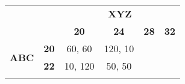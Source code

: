 \documentclass{standalone}
\begin{document}
\begin{tabular}{rccccc}
& & \multicolumn{4}{c}{\textbf{XYZ}} \\
& & \textbf{20} & \textbf{24} & \textbf{28} & \textbf{32}  \\ 
\cline{3-6}
\multirow{2}{*}{\textbf{ABC}}& \textbf{20} & \multicolumn{1}{|c|}{60, 60} & \multicolumn{1}{c|}{120, 10} \\ 
\cline{3-6}
& \textbf{22} & \multicolumn{1}{|c|}{10, 120} & \multicolumn{1}{c|}{50, 50} \\ 
\cline{3-6}\\
\end{tabular}
\end{document}
